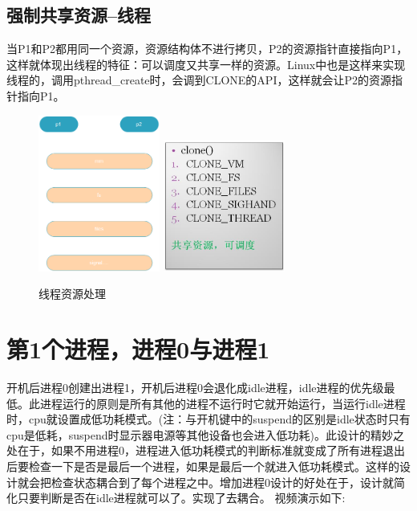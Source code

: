 \begin{tcolorbox}[colback=blue!5,colframe=blue!75!black,title=vfork 视频]
\end{tcolorbox}

\subsection{强制共享资源--线程}
当P1和P2都用同一个资源，资源结构体不进行拷贝，P2的资源指针直接指向P1，这样就体现出线程的特征：可以调度又共享一样的资源。Linux中也是这样来实现线程的，调用pthread\_create时，会调到CLONE的API，这样就会让P2的资源指针指向P1。
\begin{figure}[H]
 \wdfigbox
  {\caption{线程资源处理}\label{thread_mem}}
  {
  \includegraphics[width=4cm]{./figure/thread_resource.png}
  \includegraphics[width=4cm]{./figure/clone_api.jpg}
  }
\end{figure}
\begin{tcolorbox}[colback=blue!5,colframe=blue!75!black,title=thread 视频]
\end{tcolorbox}

\section{第1个进程，进程0与进程1}
开机后进程0创建出进程1，开机后进程0会退化成idle进程，idle进程的优先级最低。此进程运行的原则是所有其他的进程不运行时它就开始运行，当运行idle进程时，cpu就设置成低功耗模式。(注：与开机键中的suspend的区别是idle状态时只有cpu是低耗，suspend时显示器电源等其他设备也会进入低功耗)。此设计的精妙之处在于，如果不用进程0，进程进入低功耗模式的判断标准就变成了所有进程退出后要检查一下是否是最后一个进程，如果是最后一个就进入低功耗模式。这样的设计就会把检查状态耦合到了每个进程之中。增加进程0设计的好处在于，设计就简化只要判断是否在idle进程就可以了。实现了去耦合。
视频演示如下:
\begin{tcolorbox}[colback=blue!5,colframe=blue!75!black,title=idle进程视频]
\end{tcolorbox}

